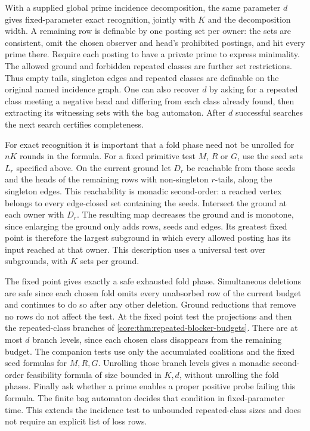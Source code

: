 With a supplied global prime incidence decomposition,
the same parameter $d$ gives fixed-parameter exact
recognition, jointly with $K$ and the decomposition
width. A remaining row is definable by one posting
set per owner: the sets are consistent, omit the
chosen observer and head's prohibited postings,
and hit every prime there. Require each posting to
have a private prime to express minimality. The
allowed ground and forbidden repeated classes
are further set restrictions. Thus empty tails,
singleton edges and repeated classes are definable
on the original named incidence graph. One can also
recover $d$ by asking for a repeated class meeting a
negative head and differing from each class already
found, then extracting its witnessing sets with the
bag automaton. After $d$ successful searches the
next search certifies completeness.

For exact recognition it is important that a fold
phase need not be unrolled for $nK$ rounds in the
formula. For a fixed primitive test $M$, $R$ or $G$,
use the seed sets $L_r$ specified above. On the
current ground let $D_r$ be reachable from those
seeds and the heads of the remaining rows with
non-singleton $r$-tails, along the singleton edges.
This reachability is monadic second-order: a reached
vertex belongs to every edge-closed set containing
the seeds. Intersect the ground at each owner with
$D_r$. The resulting map decreases the ground and
is monotone, since enlarging the ground only adds
rows, seeds and edges. Its greatest fixed point is
therefore the largest subground in which every
allowed posting has its input reached at that owner.
This description uses a universal test over
subgrounds, with $K$ sets per ground.

The fixed point gives exactly a safe exhausted fold
phase. Simultaneous deletions are safe since each
chosen fold omits every unabsorbed row of the
current budget and continues to do so after any
other deletion. Ground reductions that remove no
rows do not affect the test. At the fixed point
test the projections and then the repeated-class
branches of \cref{core:thm:repeated-blocker-budgets}.
There are at most $d$ branch levels, since each
chosen class disappears from the remaining budget.
The companion tests use only the accumulated
coalitions and the fixed seed formulas for $M,R,G$.
Unrolling those branch levels gives a monadic
second-order feasibility formula of size bounded
in $K,d$, without unrolling the fold phases.
Finally ask whether a prime enables a proper
positive probe failing this formula. The finite
bag automaton decides that condition in
fixed-parameter time. This extends the incidence
test to unbounded repeated-class sizes and does
not require an explicit list of loss rows.

